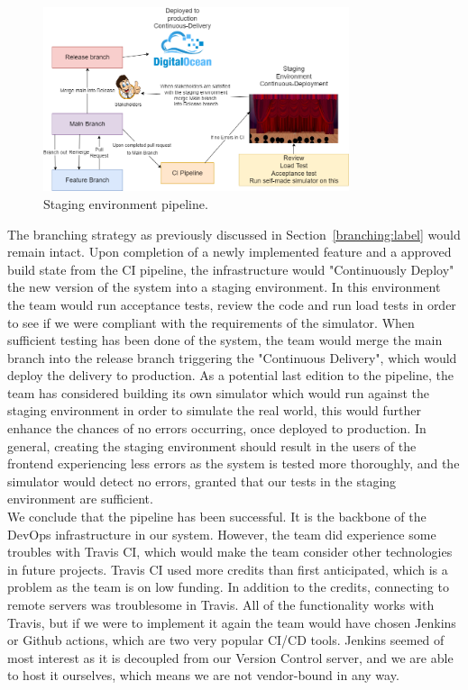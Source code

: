 \begin{figure}[h]
    \centering
    \includegraphics[width=0.8\textwidth]{images/image.PNG}
    \caption{{Staging environment pipeline.}}
    \label{fig:pipeline}
\end{figure}

The branching strategy as previously discussed in Section~\ref{branching:label} would remain intact. Upon completion of a newly implemented feature and a approved build state from the CI pipeline, the infrastructure would "Continuously Deploy" the new version of the system into a staging environment. In this environment the team would run acceptance tests, review the code and run load tests in order to see if we were compliant with the requirements of the simulator. When sufficient testing has been done of the system, the team would merge the main branch into the release branch triggering the "Continuous Delivery", which would deploy the delivery to production. As a potential last edition to the pipeline, the team has considered building its own simulator which would run against the staging environment in order to simulate the real world, this would further enhance the chances of no errors occurring, once deployed to production. In general, creating the staging environment should result in the users of the frontend experiencing less errors as the system is tested more thoroughly, and the simulator would detect no errors, granted that our tests in the staging environment are sufficient.\\ 

We conclude that the pipeline has been successful. It is the backbone of the DevOps infrastructure in our system. However, the team did experience some troubles with Travis CI, which would make the team consider other technologies in future projects. Travis CI used more credits than first anticipated, which is a problem as the team is on low funding. In addition to the credits, connecting to remote servers was troublesome in Travis. All of the functionality works with Travis, but if we were to implement it again the team would have chosen Jenkins or Github actions, which are two very popular CI/CD tools. Jenkins seemed of most interest as it is decoupled from our Version Control server, and we are able to host it ourselves, which means we are not vendor-bound in any way.\\

